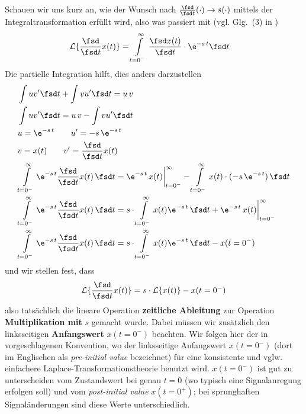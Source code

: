 Schauen wir uns kurz an, wie der Wunsch nach
$\frac{\fsd }{\fsd t} (\cdot) \rightarrow s(\cdot )$
mittels der Integraltransformation erfüllt wird, also was passiert mit (vgl. Glg.~(3) in \cite{Lundberg2007})
\begin{align}
\mathcal{L}\{\frac{\fsd }{\fsd t}  x(t)\} &= \int\limits_{t=0^-}^{\infty} \frac{\fsd x(t)}{\fsd t} \cdot \e^{-s\,t} \fsd t
\end{align}
Die partielle Integration hilft, dies anders darzustellen
\begin{align}
&\int u v' \fsd t + \int v u' \fsd t = u\,v\\
&\int u v' \fsd t = u\,v - \int v u' \fsd t\\
&u = \e^{-s\,t}\qquad u' = -s\,\e^{-s\,t}\\
&v = x(t)\qquad v' = \frac{\fsd }{\fsd t}  x(t)\\
&\int\limits_{t=0^-}^{\infty} \e^{-s\,t} \frac{\fsd }{\fsd t}  x(t) \, \fsd t
= \e^{-s\,t}\,x(t)\bigg|_{t=0^-}^{\infty} - \int\limits_{t=0^-}^{\infty} x(t) \cdot (-s\,\e^{-s\,t}) \, \fsd t\\
&\int\limits_{t=0^-}^{\infty} \e^{-s\,t} \frac{\fsd }{\fsd t}  x(t) \, \fsd t
= s \cdot \int\limits_{t=0^-}^{\infty} x(t) \e^{-s\,t} \, \fsd t
+\e^{-s\,t}\,x(t)\bigg|_{t=0^-}^{\infty}\\
&\int\limits_{t=0^-}^{\infty} \e^{-s\,t} \frac{\fsd }{\fsd t}  x(t) \, \fsd t
= s \cdot \int\limits_{t=0^-}^{\infty} x(t) \e^{-s\,t} \, \fsd t - x(t=0^-)
\end{align}
und wir stellen fest, dass
\begin{align}
\label{eq:laplace_diff_satz}
\mathcal{L}\{\frac{\fsd }{\fsd t}  x(t)\}  = s \cdot \mathcal{L}\{x(t)\} - x(t=0^-)
\end{align}
also tatsächlich die lineare Operation \textbf{zeitliche Ableitung} zur Operation
\textbf{Multiplikation mit} $s$ gemacht wurde. Dabei müssen wir zusätzlich den
linksseitigen \textbf{Anfangswert} $x(t=0^-)$ beachten.
Wir folgen hier der in \cite{Lundberg2007}
vorgeschlagenen Konvention, wo der linksseitige Anfangswert $x(t=0^-)$
(dort im Englischen als \textit{pre-initial value} bezeichnet) für eine
konsistente und vglw. einfachere Laplace-Transformationstheorie benutzt wird.
$x(t=0^-)$ ist gut zu unterscheiden vom Zustandswert bei genau $t=0$ (wo typisch
eine Signalanregung erfolgen soll) und vom
\textit{post-initial value} $x(t=0^+)$; bei sprunghaften Signaländerungen
sind diese Werte unterschiedlich.

